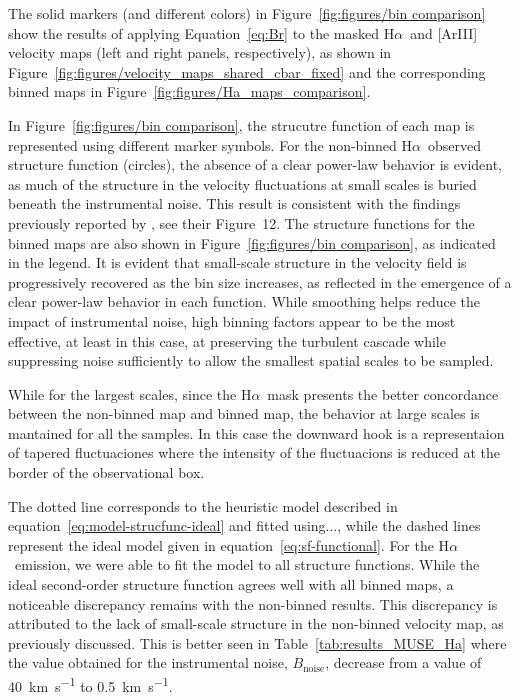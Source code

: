 \documentclass[fleqn,usenatbib, useAMS, a4paper]{mnras}
\newcommand\halpha{H${\alpha}$}
\begin{document}
The solid markers (and different colors) in Figure~\ref{fig:figures/bin comparison} show the results of applying Equation~\eqref{eq:Br} to the masked \halpha\ and [ArIII] velocity maps (left and right panels, respectively), as shown in Figure~\ref{fig:figures/velocity_maps_shared_cbar_fixed} and the corresponding binned maps in Figure~\ref{fig:figures/Ha_maps_comparison}.

In Figure~\ref{fig:figures/bin comparison}, the strucutre function of each map is represented using different marker symbols.  
For the non-binned \halpha\ observed structure function (circles), the absence of a clear power-law behavior is evident, as much of the structure in the velocity fluctuations at small scales is buried beneath the instrumental noise.  
This result is consistent with the findings previously reported by \citet{2016MNRAS.455.4057M}, see their Figure~12.
The structure functions for the binned maps are also shown in Figure~\ref{fig:figures/bin comparison}, as indicated in the legend.  
It is evident that small-scale structure in the velocity field is progressively recovered as the bin size increases, as reflected in the emergence of a clear power-law behavior in each function.  
While smoothing helps reduce the impact of instrumental noise, high binning factors appear to be the most effective, at least in this case, at preserving the turbulent cascade while suppressing noise sufficiently to allow the smallest spatial scales to be sampled.

While for the largest scales, since the \halpha\ mask presents the better concordance between the non-binned map and binned map, the behavior at large scales is mantained for all the samples.
In this case the downward hook is a representaion of tapered fluctuaciones where the intensity of the fluctuacions is reduced at the border of the observational box.

The dotted line corresponds to the heuristic model described in equation~\eqref{eq:model-strucfunc-ideal} and fitted using..., while the dashed lines represent the ideal model given in equation~\eqref{eq:sf-functional}.  
For the \halpha\ emission, we were able to fit the model to all structure functions. While the ideal second-order structure function agrees well with all binned maps, a noticeable discrepancy remains with the non-binned results.  
This discrepancy is attributed to the lack of small-scale structure in the non-binned velocity map, as previously discussed.
This is better seen in Table~\ref{tab:results_MUSE_Ha} where the value obtained for the instrumental noise, \( B_{\text{noise}} \), decrease from a value of \SI{40}{km.s^{-1}} to \SI{0.5}{km.s^{-1}}.
\end{document}
